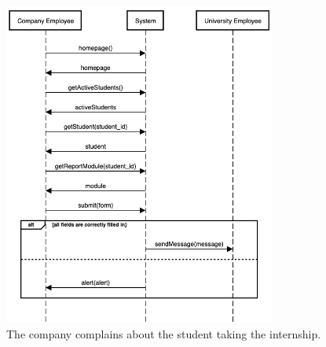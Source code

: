     \begin{figure}[H]
        \centering
        \includegraphics[width=0.8\textwidth]{RASD/Assets/SequenceDiagrams/10-company-sends-a-complaint.png}
        \caption{The company complains about the student taking the internship.}
        \label{fig:The company complains about the student taking the internship}
    \end{figure}